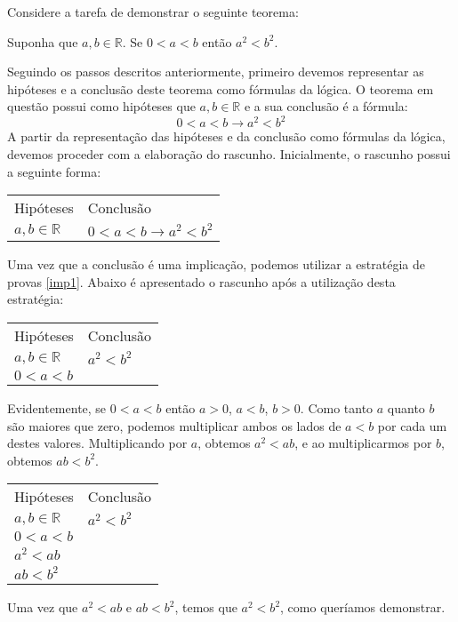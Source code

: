 \begin{Example}
Considere a tarefa de demonstrar o seguinte teorema:
\begin{flushleft}
Suponha que  $a,b\in\mathbb{R}$. Se $0 < a < b$ então $a^2 < b^2$.
\end{flushleft}
Seguindo os passos descritos anteriormente, primeiro devemos
representar as hipóteses e a conclusão deste teorema como fórmulas da
lógica.
O teorema em questão possui como hipóteses que $a,b\in\mathbb{R}$ e a sua
conclusão é a fórmula:
\[
0 < a < b \to a^2 < b^2
\]
A partir da representação das hipóteses e da conclusão como fórmulas
da lógica, devemos proceder com a elaboração do rascunho.
Inicialmente, o rascunho possui a seguinte forma:
\begin{flushleft}
\begin{tabular}{ll}
Hipóteses & Conclusão \\
$a,b\in\mathbb{R}$ & $0 < a < b \to a^2 < b^2$\\
\end{tabular}
\end{flushleft}
Uma vez que a conclusão é uma implicação, podemos utilizar a
estratégia de provas \ref{imp1}. Abaixo é apresentado o rascunho após
a utilização desta estratégia:
\begin{flushleft}
\begin{tabular}{ll}
Hipóteses & Conclusão \\
$a,b\in\mathbb{R}$ & $ a^2 < b^2$\\
$0 < a < b$ & \\
\end{tabular}
\end{flushleft}
Evidentemente, se $0 < a < b$ então $a > 0$, $a < b$, $b > 0$. Como
tanto $a$ quanto $b$ são maiores que zero, podemos multiplicar ambos
os lados de $a < b$ por cada um destes valores. Multiplicando por $a$,
obtemos $a^2 < ab$, e ao multiplicarmos por $b$, obtemos $ab < b^2$.
\begin{flushleft}
\begin{tabular}{ll}
Hipóteses & Conclusão \\
$a,b\in\mathbb{R}$ & $ a^2 < b^2$\\
$0 < a < b$ & \\
$a^2 < ab$  & \\
$ab < b^2$ &\\
\end{tabular}
\end{flushleft}
Uma vez que $a^2 < ab$ e $ab < b^2$, temos que $a^2 < b^2$, como
queríamos demonstrar.


\end{Example}

